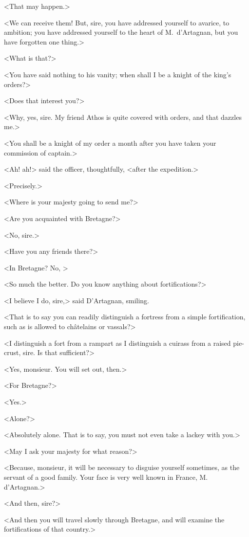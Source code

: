 <That may happen.>

<We can receive them! But, sire, you have addressed yourself to avarice, to ambition; you have addressed yourself to the heart of M.~d'Artagnan, but you have forgotten one thing.>

<What is that?>

<You have said nothing to his vanity; when shall I be a knight of the king's orders?>

<Does that interest you?>

<Why, yes, sire. My friend Athos is quite covered with orders, and that dazzles me.>

<You shall be a knight of my order a month after you have taken your commission of captain.>

<Ah! ah!> said the officer, thoughtfully, <after the expedition.>

<Precisely.>

<Where is your majesty going to send me?>

<Are you acquainted with Bretagne?>

<No, sire.>

<Have you any friends there?>

<In Bretagne? No, >

<So much the better. Do you know anything about fortifications?>

<I believe I do, sire,> said D'Artagnan, smiling.

<That is to say you can readily distinguish a fortress from a simple fortification, such as is allowed to châtelains or vassals?>

<I distinguish a fort from a rampart as I distinguish a cuirass from a raised pie-crust, sire. Is that sufficient?>

<Yes, monsieur. You will set out, then.>

<For Bretagne?>

<Yes.>

<Alone?>

<Absolutely alone. That is to say, you must not even take a lackey with you.>

<May I ask your majesty for what reason?>

<Because, monsieur, it will be necessary to disguise yourself sometimes, as the servant of a good family. Your face is very well known in France, M.~ d'Artagnan.>

<And then, sire?>

<And then you will travel slowly through Bretagne, and will examine the fortifications of that country.>

